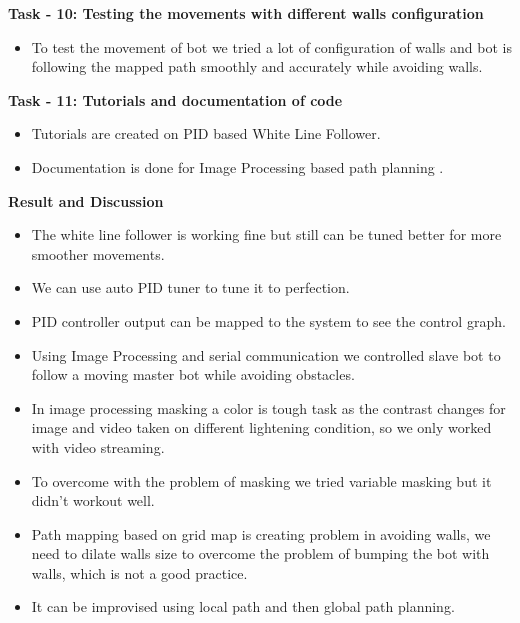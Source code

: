 \documentclass[report]{res}
\begin{document}
	{\Large \textbf{Task - 10: Testing the movements with different walls configuration}} \\
	
	\begin{itemize}
		
		\item To test the movement of bot we tried a lot of configuration of walls and bot is following the mapped path smoothly and accurately while avoiding walls. \\
		
	\end{itemize}
	
	{\Large \textbf{Task - 11: Tutorials and documentation of code}} \\
	
	\begin{itemize}
		
		\item Tutorials are created on PID based White Line Follower.
		\item Documentation is done for Image Processing based path planning  .
		
	\end{itemize}
	
	\pagebreak
	
	
	\begin{center}
		{\huge\textbf{Result and Discussion}\par}
	\end{center}
	
	\begin{itemize}
		
		\item The white line follower is working fine but still can be tuned better for more smoother movements.
		\item We can use auto PID tuner to tune it to perfection. 
		\item PID controller output can be mapped to the system to see the control graph. 
		\item Using Image Processing and serial communication we controlled slave bot to follow a moving master bot while avoiding obstacles. 
		\item In image processing masking a color is tough task as the contrast changes for image and video taken on different lightening condition, so we only worked with video streaming. 
		\item To overcome with the problem of masking we tried variable masking but it didn't workout well. 
		\item Path mapping based on grid map is creating problem in avoiding walls, we need to dilate walls size to overcome the problem of bumping the bot with walls, which is not a good practice. 
		\item It can be improvised using local path and then global path planning.
		
	\end{itemize}
	
\end{document}
